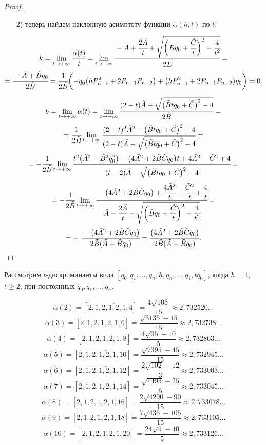 \begin{proof}
\begin{enumerate}
\item[2) ]теперь найдем наклонную асимптоту функции $\alpha(h,t)$ по $t$:
\end{enumerate}

\[k=\lim_{t\to +\infty}\cfrac{\alpha(t)}t=\lim_{t\to +\infty}\cfrac{-\tilde{A}+\cfrac{2\tilde{A}}{t}+\sqrt{\biggl(\tilde{B}q_{0}+\cfrac {\tilde{C}}t\biggr)^{2}-\cfrac4{t^{2}}}}{2\tilde{E}}=\]
\[=\cfrac{-\tilde{A}+\tilde{B}q_{0}}{2\tilde{B}}=\cfrac {1}{2\tilde{B}}\biggl(-q_{0}\bigl(hP^{2}_{n-1}+2P_{n-1}P_{n-2}\bigr)+\bigl(hP^{2}_{n-1}+2P_{n-1}P_{n-2}\bigr)q_{0}\biggr)=0.\]

\[b=\lim_{t\to +\infty}\alpha(t)=\lim_{t\to +\infty}\cfrac{(2-t)\tilde{A}+\sqrt{\bigl(\tilde{B}tq_{0}+\tilde{C}\bigr)^{2}-4}}{2\tilde{B}}=\]
\[=\cfrac1{2\tilde{B}}\lim_{t\to +\infty}\cfrac{(2-t)^{2}\tilde{A}^{2}-\bigl(\tilde{B}tq_{0}+\tilde{C}\bigr)^{2}+4}{(2-t)\tilde{A}-\sqrt{\bigl(\tilde{B}tq_{0}+\tilde{C}\bigr)^{2}-4}}=\]
\[=-\cfrac1{2\tilde{B}}\lim_{t\to +\infty}\cfrac{t^{2}\bigl(\tilde{A}^{2}-\tilde{B}^{2}q^{2}_{0}\bigr)-\bigl(4\tilde{A}^{2}+2\tilde{B}\tilde{C}q_{0}\bigr)t+4\tilde{A}^{2}-\tilde{C}^{2}+4}
{(t-2)\tilde{A}-\sqrt{\bigl(\tilde{B}tq_{0}+\tilde{C}\bigr)^{2}-4}}=\]
\[=-\cfrac1{2\tilde{B}}\lim_{t\to +\infty}\cfrac{-\bigl(4\tilde{A}^{2}+2\tilde{B}\tilde{C}q_{0}\bigr)+\cfrac{4\tilde{A}^{2}}t-\cfrac{\tilde{C}^{2}}t+\cfrac4t}
{\tilde{A}-\cfrac{2\tilde{A}}{t}-\sqrt{\biggl(\tilde{B}q_{0}+\cfrac{\tilde{C}}t\biggr)^{2}-\cfrac{4}{t^{2}}}}=\]
\[=- \ \cfrac{-\bigl(4\tilde{A}^{2}+2\tilde{B}\tilde{C}q_{0}\bigr)}{2\tilde{B}(\tilde{A}+\tilde{B}q_{0})}=
\cfrac{\bigl(4\tilde{A}^{2}+2\tilde{B}\tilde{C}q_{0}\bigr)}{2\tilde{B}(\tilde{A}+\tilde{B}q_{0})}.\]
\end{proof}


Рассмотрим $t$-дискриминанты вида $[{q_0},\overline{{q_1},\dots,{q_n},{h},{q_n},\dots,{q_1},{t{q_0}}}]$,
когда $h=1$, \newline $t\geq 2$, при постоянных ${q_0},{q_1},\dots,{q_n}.$

\begin{exampler}
\[\alpha(2)=[2,\overline{1,2,1,2,1,4}]=\frac {4\sqrt{105}}{15}\approx 2,732520\dots\]
\[\alpha(3)=[2,\overline{1,2,1,2,1,6}]=\frac{\sqrt{3135}-15}{15}\approx 2,732738\dots\]
\[\alpha(4)=[2,\overline{1,2,1,2,1,8}]=\frac {4\sqrt{35}-10}{5}\approx 2,732863\dots\]
\[\alpha(5)=[2,\overline{1,2,1,2,1,10}]=\frac {\sqrt{7395}-45}{15}\approx 2,732945\dots\]
\[\alpha(6)=[2,\overline{1,2,1,2,1,12}]=\frac {2\sqrt{102}-12}{3}\approx 2,733003\dots\]
\[\alpha(7)=[2,\overline{1,2,1,2,1,14}]=\frac {\sqrt{1495}-25}{5}\approx 2,733045\dots\]
\[\alpha(8)=[2,\overline{1,2,1,2,1,16}]=\frac{2\sqrt{4290}-90}{15}\approx 2,733078\dots\]
\[\alpha(9)=[2,\overline{1,2,1,2,1,18}]=\frac {7\sqrt{435}-105}{15}\approx 2,733105\dots\]
\[\alpha(10)=[2,\overline{1,2,1,2,1,20}]=\frac {24\sqrt{5}-40}{5}\approx 2,733126\dots\]
\end{exampler}

